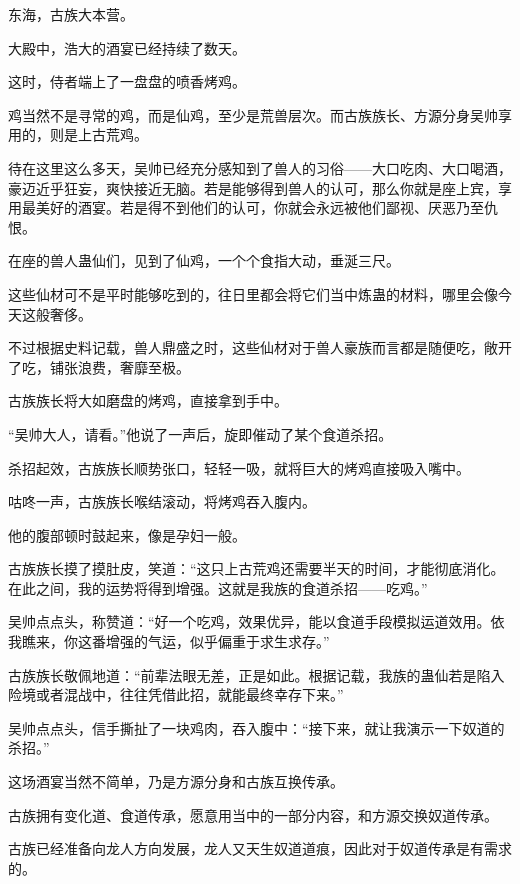 
\begin{this_body}



东海，古族大本营。

大殿中，浩大的酒宴已经持续了数天。

这时，侍者端上了一盘盘的喷香烤鸡。

鸡当然不是寻常的鸡，而是仙鸡，至少是荒兽层次。而古族族长、方源分身吴帅享用的，则是上古荒鸡。

待在这里这么多天，吴帅已经充分感知到了兽人的习俗——大口吃肉、大口喝酒，豪迈近乎狂妄，爽快接近无脑。若是能够得到兽人的认可，那么你就是座上宾，享用最美好的酒宴。若是得不到他们的认可，你就会永远被他们鄙视、厌恶乃至仇恨。

在座的兽人蛊仙们，见到了仙鸡，一个个食指大动，垂涎三尺。

这些仙材可不是平时能够吃到的，往日里都会将它们当中炼蛊的材料，哪里会像今天这般奢侈。

不过根据史料记载，兽人鼎盛之时，这些仙材对于兽人豪族而言都是随便吃，敞开了吃，铺张浪费，奢靡至极。

古族族长将大如磨盘的烤鸡，直接拿到手中。

“吴帅大人，请看。”他说了一声后，旋即催动了某个食道杀招。

杀招起效，古族族长顺势张口，轻轻一吸，就将巨大的烤鸡直接吸入嘴中。

咕咚一声，古族族长喉结滚动，将烤鸡吞入腹内。

他的腹部顿时鼓起来，像是孕妇一般。

古族族长摸了摸肚皮，笑道：“这只上古荒鸡还需要半天的时间，才能彻底消化。在此之间，我的运势将得到增强。这就是我族的食道杀招——吃鸡。”

吴帅点点头，称赞道：“好一个吃鸡，效果优异，能以食道手段模拟运道效用。依我瞧来，你这番增强的气运，似乎偏重于求生求存。”

古族族长敬佩地道：“前辈法眼无差，正是如此。根据记载，我族的蛊仙若是陷入险境或者混战中，往往凭借此招，就能最终幸存下来。”

吴帅点点头，信手撕扯了一块鸡肉，吞入腹中：“接下来，就让我演示一下奴道的杀招。”

这场酒宴当然不简单，乃是方源分身和古族互换传承。

古族拥有变化道、食道传承，愿意用当中的一部分内容，和方源交换奴道传承。

古族已经准备向龙人方向发展，龙人又天生奴道道痕，因此对于奴道传承是有需求的。


\end{this_body}
